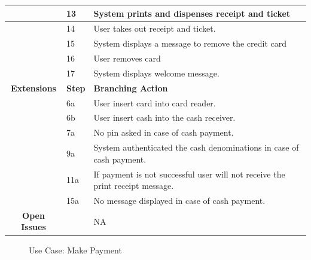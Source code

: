 \documentclass[a4paper,12pt]{report}
\begin{document}
\begin{tabular}{ | c | p{2cm} | p{7cm} |}
	\hline
	&  13  & System prints and dispenses receipt and ticket \\
	\hline
	&  14  & User takes out receipt and ticket. \\
	\hline
	&  15  & System displays a message to remove the credit card \\
	\hline
	&  16  & User removes card \\
	\hline
	&  17  & System displays welcome message. \\
	\hline
	
	\textbf{Extensions} & \textbf{Step} & \textbf{Branching Action} \\
	\hline
	&  6a  & User insert card into card reader. \\
	\hline
	&  6b  & User insert cash into the cash receiver. \\
	\hline
	&  7a  & No pin asked in case of cash payment. \\
	\hline
	&  9a  & System authenticated the cash denominations in case of cash payment. \\
	\hline
	&  11a  & If payment is not successful user will not receive the print receipt message. \\
	\hline
	&  15a  & No message displayed in case of cash payment. \\
	\hline
	\textbf{Open Issues} &    & NA \\
	\hline
	
\end{tabular}


\begin{figure}[!htb]
	\caption{\label{fig:uc_make_payment}Use Case: Make Payment}	
\end{figure}
\end{document}
